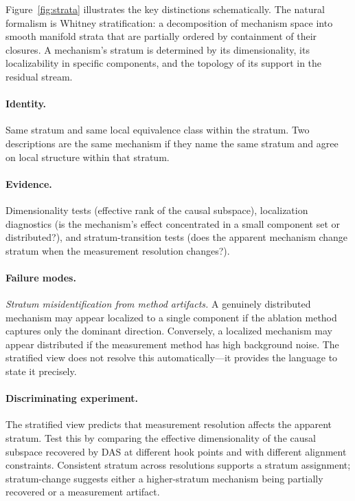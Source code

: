 \documentclass[11pt]{article}
\theoremstyle{remark}
\begin{document}
Figure~\ref{fig:strata} illustrates the key distinctions schematically.
The natural formalism is Whitney stratification: a decomposition of
mechanism space into smooth manifold strata that are partially ordered
by containment of their closures.  A mechanism's stratum is determined
by its dimensionality, its localizability in specific components, and
the topology of its support in the residual stream.

\paragraph{Identity.}
Same stratum and same local equivalence class within the stratum.  Two
descriptions are the same mechanism if they name the same stratum and
agree on local structure within that stratum.

\paragraph{Evidence.}
Dimensionality tests (effective rank of the causal subspace),
localization diagnostics (is the mechanism's effect concentrated in a
small component set or distributed?), and stratum-transition tests
(does the apparent mechanism change stratum when the measurement
resolution changes?).

\paragraph{Failure modes.}
\emph{Stratum misidentification from method artifacts.}  A genuinely
distributed mechanism may appear localized to a single component if
the ablation method captures only the dominant direction.  Conversely,
a localized mechanism may appear distributed if the measurement method
has high background noise.  The stratified view does not resolve this
automatically---it provides the language to state it precisely.

\paragraph{Discriminating experiment.}
The stratified view predicts that measurement resolution affects the
apparent stratum.  Test this by comparing the effective dimensionality
of the causal subspace recovered by DAS at different hook points and
with different alignment constraints.  Consistent stratum across
resolutions supports a stratum assignment; stratum-change suggests
either a higher-stratum mechanism being partially recovered or a
measurement artifact.
\end{document}
